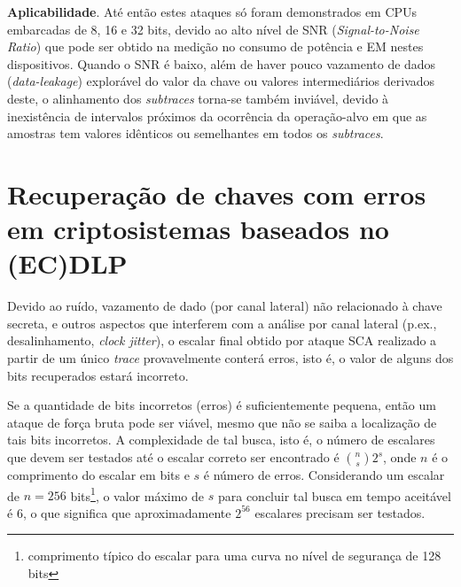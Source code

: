 \documentclass{SBCbookchapter}
\begin{document}
\noindent \textbf{Aplicabilidade}. Até então estes ataques só foram demonstrados em CPUs embarcadas de 8, 16 e 32 bits, devido ao alto nível de SNR (\emph{Signal-to-Noise Ratio}) que pode ser obtido na medição no consumo de potência e EM nestes dispositivos. Quando o SNR é baixo, além de haver pouco vazamento de dados (\emph{data-leakage}) explorável do valor da chave ou valores intermediários derivados deste, o alinhamento dos \emph{subtraces} torna-se também inviável, devido à inexistência de intervalos próximos da ocorrência da operação-alvo em que as amostras tem valores idênticos ou semelhantes em todos os \emph{subtraces}.


%
\section{Recuperação de chaves com erros em criptosistemas baseados no (EC)DLP}

%
Devido ao ruído, vazamento de dado (por canal lateral) não relacionado à chave secreta, e outros aspectos que interferem com a análise por canal lateral (p.ex., desalinhamento, \emph{clock jitter}), o escalar final obtido por ataque SCA realizado a partir de um único \emph{trace} provavelmente conterá erros, isto é, o valor de alguns dos bits recuperados estará incorreto.

%
%
Se a quantidade de bits incorretos (erros) é suficientemente pequena, então um ataque de força bruta pode ser viável, mesmo que não se saiba a localização de tais bits incorretos. A complexidade de tal busca, isto é, o número de escalares que devem ser testados até o escalar correto ser encontrado é ${{n}\choose{s}} 2^s$, onde $n$ é o comprimento do escalar em bits e $s$ é número de erros. Considerando um escalar de $n = 256$ bits\footnote{comprimento típico do escalar para uma curva no nível de segurança de 128 bits}, o valor máximo de $s$ para concluir tal busca em tempo aceitável é 6, o que significa que aproximadamente $2^{56}$ escalares precisam ser testados.
\end{document}
